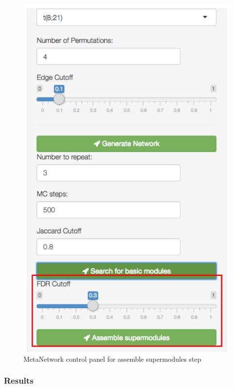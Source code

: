 \begin{steps}
\begin{figure}[H]
\begin{center}
\includegraphics[scale=0.5]{./figure/MetaNetwork/MetaNetworkstep3}
\caption{MetaNetwork control panel for assemble supermodules step}
\label{fig:MetaNetworkstep3}
\end{center}
\end{figure}



\end{steps}

\subsubsection{Results}

